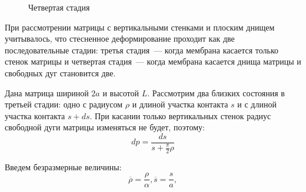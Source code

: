 \begin{figure}[h!]
\begin{minipage}[h]{0.48\linewidth}
				\def\svgwidth{\columnwidth}
                \caption{ Четвертая стадия }
				\label{vert_matrix_pic2}		
		\end{minipage}
		
	\end{figure}
	При рассмотрении матрицы с вертикальными стенками и плоским днищем учитывалось, 
	что стесненное деформирование проходит как две последовательные стадии: 
	третья стадия~--- когда мембрана касается только стенок матрицы и четвертая 
	стадия~--- когда мембрана касается днища матрицы и свободных дуг становится две.
	
	
	Дана матрица шириной $2a$ и высотой $L$.
	Рассмотрим два близких состояния в третьей стадии:
	одно  с радиусом $\rho$ и длиной участка контакта $s$ и с длиной участка контакта $s+ds$. При касании только вертикальных стенок радиус свободной дуги матрицы изменяться не будет, поэтому: 
\begin{equation}
dp = \dfrac{ds}{s+\frac{\pi}{2}\rho}
\label{vertikal_matrix_trird}
\end{equation}

Введем безразмерные величины:
\begin{equation}
\overline{\rho} = \dfrac{\rho}{\alpha}, \overline{s}=\dfrac{s}{a},
\label{parall_variables_no_dimention}
\end{equation}

